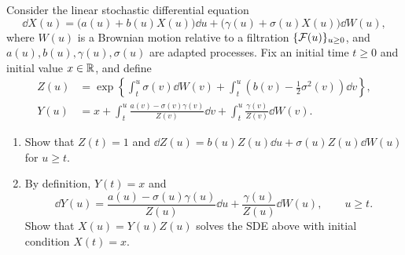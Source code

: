 \begin{problem}
    Consider the linear stochastic differential equation
    \[
    \dd X(u) = \bigl(a(u) + b(u) X(u)\bigr)\dd u + \bigl(\gamma(u) + \sigma(u) X(u)\bigr)\dd W(u),
    \]
    where $W(u)$ is a Brownian motion relative to a filtration $\{\mathcal{F}(u)\}_{u \geq 0}$, and $a(u), b(u), \gamma(u), \sigma(u)$ are adapted processes. Fix an initial time $t \geq 0$ and initial value $x \in \mathbb{R}$, and define
    \begin{align*}
    Z(u) &= \exp\!\left\{\int_t^u \sigma(v)\dd W(v) + \int_t^u \left(b(v) - \frac{1}{2}\sigma^2(v)\right)\dd v\right\}, \\
    Y(u) &= x + \int_t^u \frac{a(v) - \sigma(v)\gamma(v)}{Z(v)}\dd v + \int_t^u \frac{\gamma(v)}{Z(v)}\dd W(v).
    \end{align*}
    \begin{enumerate}
        \item Show that $Z(t) = 1$ and $\dd Z(u) = b(u) Z(u)\dd u + \sigma(u) Z(u)\dd W(u)$ for $u \geq t$.
        \item By definition, $Y(t) = x$ and
        \[
        \dd Y(u) = \frac{a(u) - \sigma(u)\gamma(u)}{Z(u)}\dd u + \frac{\gamma(u)}{Z(u)}\dd W(u), \qquad u \geq t.
        \]
        Show that $X(u) = Y(u) Z(u)$ solves the SDE above with initial condition $X(t) = x$.
    \end{enumerate}
\end{problem}

